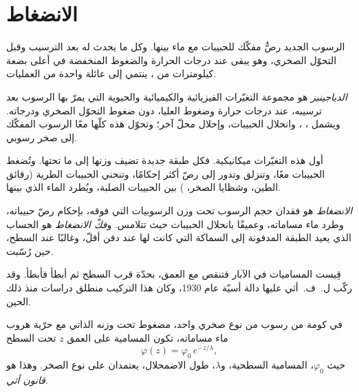 \section{الانضغاط}\label{sec:b1:diagenesis-basins:compaction}

الرسوب الجديد رصٌّ مفكّك للحبيبات مع ماء بينها. وكل ما يحدث له بعد الترسيب وقبل التحوّل الصخري، وهو يبقى عند درجات الحرارة والضغوط المنخفضة في أعلى بضعة كيلومترات من ، ينتمي إلى عائلة واحدة من العمليات.

\begin{definition}[الدياجينيز]\label{def:b1:diagenesis-basins:diagenesis}
\emph{الدياجينيز} هو مجموعة التغيّرات الفيزيائية والكيميائية والحيوية التي يمرّ بها الرسوب بعد ترسيبه، عند درجات حرارة وضغوط  العليا، دون ضغوط التحوّل الصخري ودرجاته. ويشمل ، ، وانحلال الحبيبات، وإحلال  محلّ آخر؛ وتحوّل هذه كلّها معًا الرسوب المفكّك إلى صخر رسوبي.
\end{definition}

أول هذه التغيّرات ميكانيكية. فكل طبقة جديدة تضيف وزنها إلى ما تحتها. وتُضغط الحبيبات معًا، وتنزلق وتدور إلى رصّ أكثر إحكامًا، وتنحني الحبيبات الطرية (رقائق الطين، وشظايا الصخر، ) بين الحبيبات الصلبة، ويُطرد الماء الذي بينها.

\begin{definition}\label{def:b1:diagenesis-basins:compaction}
\emph{الانضغاط} هو فقدان حجم الرسوب تحت وزن الرسوبيات التي فوقه، بإحكام رصّ حبيباته، وطرد ماء مساماته، وعميقًا بانحلال الحبيبات حيث تتلامس. و\emph{فكّ الانضغاط} هو الحساب الذي يعيد الطبقة المدفونة إلى السماكة التي كانت لها عند دفن أقلّ، وغالبًا عند السطح، حين رُسّبت.
\end{definition}

قِيست المساميات في الآبار فتنقص مع العمق، بحدّة قرب السطح ثم أبطأ فأبطأ. وقد ركّب ل.~ف.~أثي عليها دالة أسيّة عام 1930، وكان هذا التركيب منطلق دراسات  منذ ذلك الحين.

\begin{proposition}\label{prop:b1:diagenesis-basins:athy}
في كومة من رسوب من نوع صخري واحد، مضغوط تحت وزنه الذاتي مع حرّية هروب ماء مساماته، تكون المسامية على العمق $z$ تحت السطح
\[
  \varphi(z) = \varphi_0\, e^{-z/\lambda},
\]
حيث $\varphi_0$، المسامية السطحية، و$\lambda$، طول الاضمحلال، يعتمدان على نوع الصخر. وهذا هو \emph{قانون أثي}.
\end{proposition}
\admitted

